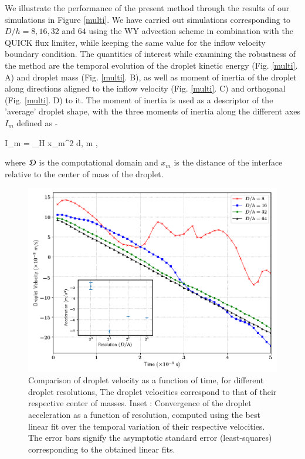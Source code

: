 We illustrate the performance of the present method through the results of our simulations in Figure \ref{multi}. We have carried out simulations corresponding to $D/h = 8, 16, 32 $ and $64$ using the WY advection scheme in combination with the QUICK flux limiter, while keeping the same value for the inflow velocity boundary condition. The quantities of interest while examining the robustness of the method are the temporal evolution of the droplet kinetic energy (Fig. \ref{multi}. A) and droplet mass (Fig. \ref{multi}. B), as well as moment of inertia of the droplet along directions aligned to the inflow velocity (Fig. \ref{multi}. C) and orthogonal (Fig. \ref{multi}. D) to it. The moment of inertia is used as a descriptor of the 'average' droplet shape, with the three moments of inertia along the different axes $I_m$ defined as - 

\be
I_m = \int_\DDD H x_m^2 {\rm d}\X \;,  \le m ,
\nd

where ${\cal D}$ is the computational domain and $x_m$ is the distance of the interface relative to the center of mass of the droplet.   

\begin{figure}[h!]
\begin{center}
\includegraphics[scale = 0.5]{Figures/Sagar/dropl_velocity_accel_ppd.png}
\end{center}
\vspace*{-0.5cm}
\caption{Comparison of droplet velocity as a function of time, for different droplet resolutions, The droplet velocities correspond to that of their respective center of masses. Inset : Convergence of the droplet acceleration as a function of resolution, computed using the best linear fit over the temporal variation of their respective velocities. The error bars signify the asymptotic standard error (least-squares) corresponding to the obtained linear fits.} 
\label{drop_vel}
\end{figure}

